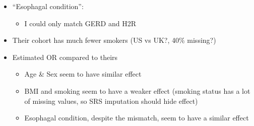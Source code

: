 \documentclass[12pt]{article}
\begin{document}
\begin{itemize}
	\item ``Esophagal condition'': 
	\begin{itemize}
		\item I could only match GERD and H2R
		
	\end{itemize}
	\item Their cohort has much fewer smokers (US vs UK?, 40\% missing?)
	\item Estimated OR compared to theirs
	\begin{itemize}
		\item Age \& Sex seem to have similar effect
		\item BMI and smoking seem to have a weaker effect (smoking status
		has a lot of missing values, so SRS imputation should hide effect)
		\item Esophagal condition, despite the mismatch, seem to have a similar effect
	\end{itemize}
\end{itemize}
\end{document}

